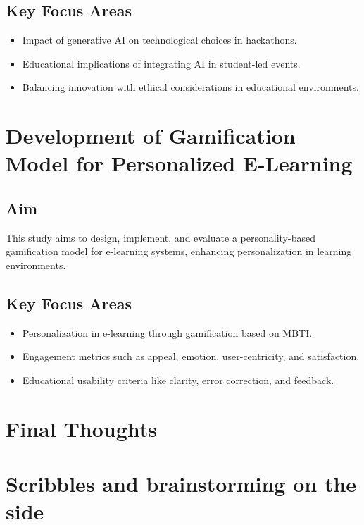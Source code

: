 \documentclass{article}
\begin{document}
\subsection{Key Focus Areas}
\begin{itemize}
    \item Impact of generative AI on technological choices in hackathons.
    \item Educational implications of integrating AI in student-led events.
    \item Balancing innovation with ethical considerations in educational environments.
\end{itemize}

\newpage
\section{Development of Gamification Model for Personalized E-Learning}

\subsection{Aim}
This study aims to design, implement, and evaluate a personality-based gamification model for e-learning systems, enhancing personalization in learning environments.

\subsection{Key Focus Areas}
\begin{itemize}
    \item Personalization in e-learning through gamification based on MBTI.
    \item Engagement metrics such as appeal, emotion, user-centricity, and satisfaction.
    \item Educational usability criteria like clarity, error correction, and feedback.
\end{itemize}

\newpage
\section{Final Thoughts}


\newpage
\section{Scribbles and brainstorming on the side}
\end{document}
